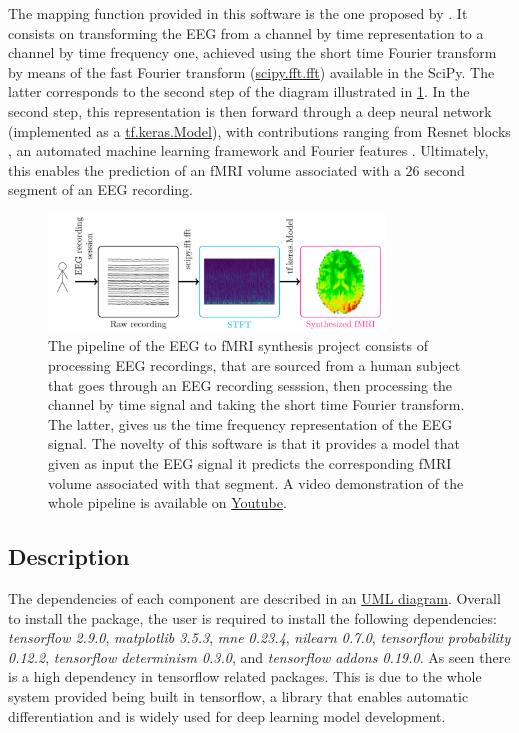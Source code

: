 The mapping function provided in this software is the one proposed by \cite{calhas2022eeg}. It consists on transforming the EEG from a channel by time representation to a channel by time frequency one, achieved using the short time Fourier transform \cite{allen1977short} by means of the fast Fourier transform (\href{https://docs.scipy.org/doc/scipy/reference/generated/scipy.fft.fft.html}{scipy.fft.fft}) available in the SciPy. The latter corresponds to the second step of the diagram illustrated in \ref{fig:pipeline}. In the second step, this representation is then forward through a deep neural network (implemented as a \href{https://www.tensorflow.org/api_docs/python/tf/keras/Model}{tf.keras.Model}), with contributions ranging from Resnet blocks \cite{he2016deep}, an automated machine learning framework \cite{calhas2022automatic} and Fourier features \cite{tancik2020fourier}. Ultimately, this enables the prediction of an fMRI volume associated with a $26$ second segment of an EEG recording. 

\begin{figure}[t]
    \centering
    \includegraphics[width=0.8\textwidth]{figures/diagram.png}
    \caption{The pipeline of the EEG to fMRI synthesis project consists of processing EEG recordings, that are sourced from a human subject that goes through an EEG recording sesssion, then processing the channel by time signal and taking the short time Fourier transform. The latter, gives us the time frequency representation of the EEG signal. The novelty of this software is that it provides a model that given as input the EEG signal it predicts the corresponding fMRI volume associated with that segment. A video demonstration of the whole pipeline is available on \href{https://youtu.be/47uJbI0hU_I}{Youtube}.}
    \label{fig:pipeline}
\end{figure}

\subsection{Description}\label{section:description}

The dependencies of each component are described in an \href{https://github.com/eeg-to-fmri/eeg-to-fmri/blob/main/project_UML.pdf}{UML diagram}. Overall to install the package, the user is required to install the following dependencies: \textit{tensorflow 2.9.0}, \textit{matplotlib 3.5.3}, \textit{mne 0.23.4}, \textit{nilearn 0.7.0}, \textit{tensorflow probability 0.12.2}, \textit{tensorflow determinism 0.3.0}, and \textit{tensorflow addons 0.19.0}. As seen there is a high dependency in tensorflow related packages. This is due to the whole system provided being built in tensorflow, a library that enables automatic differentiation and is widely used for deep learning model development.


